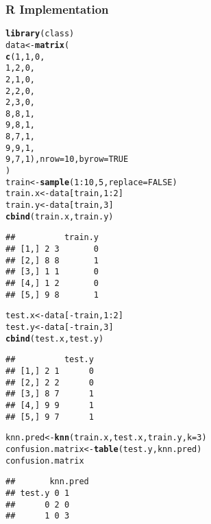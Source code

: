 \documentclass[../../dsa1101_notes.Rtex]{subfiles}\usepackage[]{graphicx}\usepackage[]{color}
\makeatletter
\newcommand{\hlnum}[1]{\textcolor[rgb]{0.686,0.059,0.569}{#1}}%
\newcommand{\hlopt}[1]{\textcolor[rgb]{0,0,0}{#1}}%
\newcommand{\hlstd}[1]{\textcolor[rgb]{0.345,0.345,0.345}{#1}}%
\newcommand{\hlkwb}[1]{\textcolor[rgb]{0.69,0.353,0.396}{#1}}%
\newcommand{\hlkwc}[1]{\textcolor[rgb]{0.333,0.667,0.333}{#1}}%
\newcommand{\hlkwd}[1]{\textcolor[rgb]{0.737,0.353,0.396}{\textbf{#1}}}%
\newenvironment{kframe}{%
 \def\at@end@of@kframe{}%
 \ifinner\ifhmode%
  \def\at@end@of@kframe{\end{minipage}}%
  \begin{minipage}{\columnwidth}%
 \fi\fi%
 \def\FrameCommand##1{\hskip\@totalleftmargin \hskip-\fboxsep
 \colorbox{shadecolor}{##1}\hskip-\fboxsep
     \hskip-\linewidth \hskip-\@totalleftmargin \hskip\columnwidth}%
 \MakeFramed {\advance\hsize-\width
   \@totalleftmargin\z@ \linewidth\hsize
   \@setminipage}}%
 {\par\unskip\endMakeFramed%
 \at@end@of@kframe}
\newenvironment{knitrout}{}{} %
\makeatother
\begin{document}
\subsubsection{R Implementation}
\begin{knitrout}
\color{fgcolor}\begin{kframe}
\begin{alltt}
\hlkwd{library}\hlstd{(class)}
\hlstd{data} \hlkwb{<-} \hlkwd{matrix}\hlstd{(}
    \hlkwd{c}\hlstd{(}\hlnum{1}\hlstd{,} \hlnum{1}\hlstd{,} \hlnum{0}\hlstd{,}
      \hlnum{1}\hlstd{,} \hlnum{2}\hlstd{,} \hlnum{0}\hlstd{,}
      \hlnum{2}\hlstd{,} \hlnum{1}\hlstd{,} \hlnum{0}\hlstd{,}
      \hlnum{2}\hlstd{,} \hlnum{2}\hlstd{,} \hlnum{0}\hlstd{,}
      \hlnum{2}\hlstd{,} \hlnum{3}\hlstd{,} \hlnum{0}\hlstd{,}
      \hlnum{8}\hlstd{,} \hlnum{8}\hlstd{,} \hlnum{1}\hlstd{,}
      \hlnum{9}\hlstd{,} \hlnum{8}\hlstd{,} \hlnum{1}\hlstd{,}
      \hlnum{8}\hlstd{,} \hlnum{7}\hlstd{,} \hlnum{1}\hlstd{,}
      \hlnum{9}\hlstd{,} \hlnum{9}\hlstd{,} \hlnum{1}\hlstd{,}
      \hlnum{9}\hlstd{,} \hlnum{7}\hlstd{,} \hlnum{1}\hlstd{),} \hlkwc{nrow} \hlstd{=} \hlnum{10}\hlstd{,} \hlkwc{byrow} \hlstd{=} \hlnum{TRUE}
\hlstd{)}
\hlstd{train} \hlkwb{<-} \hlkwd{sample}\hlstd{(}\hlnum{1}\hlopt{:}\hlnum{10}\hlstd{,} \hlnum{5}\hlstd{,} \hlkwc{replace} \hlstd{=} \hlnum{FALSE}\hlstd{)}
\hlstd{train.x} \hlkwb{<-} \hlstd{data[train,} \hlnum{1}\hlopt{:}\hlnum{2}\hlstd{]}
\hlstd{train.y} \hlkwb{<-} \hlstd{data[train,} \hlnum{3}\hlstd{]}
\hlkwd{cbind}\hlstd{(train.x, train.y)}
\end{alltt}
\begin{verbatim}
##          train.y
## [1,] 2 3       0
## [2,] 8 8       1
## [3,] 1 1       0
## [4,] 1 2       0
## [5,] 9 8       1
\end{verbatim}
\begin{alltt}
\hlstd{test.x} \hlkwb{<-} \hlstd{data[}\hlopt{-}\hlstd{train,} \hlnum{1}\hlopt{:}\hlnum{2}\hlstd{]}
\hlstd{test.y} \hlkwb{<-} \hlstd{data[}\hlopt{-}\hlstd{train,} \hlnum{3}\hlstd{]}
\hlkwd{cbind}\hlstd{(test.x, test.y)}
\end{alltt}
\begin{verbatim}
##          test.y
## [1,] 2 1      0
## [2,] 2 2      0
## [3,] 8 7      1
## [4,] 9 9      1
## [5,] 9 7      1
\end{verbatim}
\begin{alltt}
\hlstd{knn.pred} \hlkwb{<-} \hlkwd{knn}\hlstd{(train.x, test.x, train.y,} \hlkwc{k}\hlstd{=}\hlnum{3}\hlstd{)}
\hlstd{confusion.matrix} \hlkwb{<-} \hlkwd{table}\hlstd{(test.y, knn.pred)}
\hlstd{confusion.matrix}
\end{alltt}
\begin{verbatim}
##       knn.pred
## test.y 0 1
##      0 2 0
##      1 0 3
\end{verbatim}
\end{kframe}
\end{knitrout}
\end{document}
